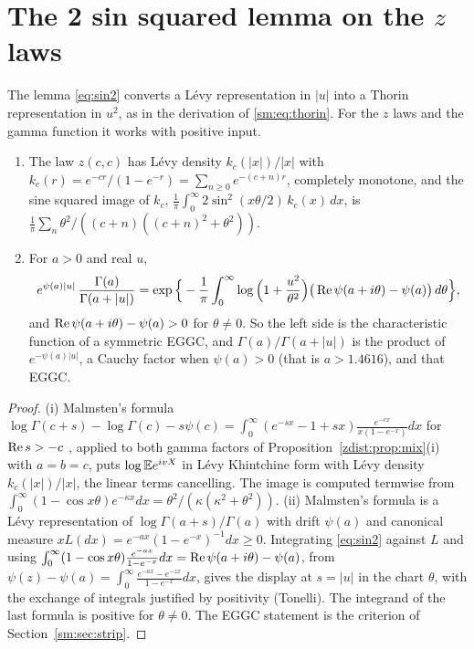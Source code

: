 \section{The 2 sin squared lemma on the \texorpdfstring{$z$}{z} laws}\label{zdist:sec:sin2}

The lemma \eqref{eq:sin2} converts a L\'evy representation in $|u|$ into a Thorin representation in $u^2$, as in the derivation of \eqref{sm:eq:thorin}. For the $z$ laws and the gamma function it works with positive input.

\begin{proposition}\label{zdist:prop:sin2}
\begin{enumerate}
\item[(i)] The law $z(c,c)$ has L\'evy density $k_c(|x|)/|x|$ with $k_c(r)=e^{-cr}/(1-e^{-r})=\sum_{n\ge0}e^{-(c+n)r}$, completely monotone, and the sine squared image of $k_c$, $\frac1\pi\int_0^\infty2\sin^2(x\theta/2)\,k_c(x)\,dx$, is $\frac1\pi\sum_n\theta^2/((c+n)((c+n)^2+\theta^2))$.
\item[(ii)] For $a>0$ and real $u$,
\[
e^{\psi(a)|u|}\,\frac{\Gamma(a)}{\Gamma(a+|u|)}=\exp\Big\{-\frac1\pi\int_0^\infty\log\Big(1+\frac{u^2}{\theta^2}\Big)\big(\operatorname{Re}\psi(a+i\theta)-\psi(a)\big)\,d\theta\Big\},
\]
and $\operatorname{Re}\psi(a+i\theta)-\psi(a)>0$ for $\theta\ne0$. So the left side is the characteristic function of a symmetric EGGC, and $\Gamma(a)/\Gamma(a+|u|)$ is the product of $e^{-\psi(a)|u|}$, a Cauchy factor when $\psi(a)>0$ (that is $a>1.4616$), and that EGGC.
\end{enumerate}
\end{proposition}

\begin{proof}
(i) Malmsten's formula $\log\Gamma(c+s)-\log\Gamma(c)-s\psi(c)=\int_0^\infty(e^{-sx}-1+sx)\frac{e^{-cx}}{x(1-e^{-x})}dx$ for $\operatorname{Re} s>-c$ \cite[Section 5.9]{DLMF}, applied to both gamma factors of Proposition~\ref{zdist:prop:mix}(i) with $a=b=c$, puts $\log\mathbb{E} e^{ivX}$ in L\'evy Khintchine form with L\'evy density $k_c(|x|)/|x|$, the linear terms cancelling. The image is computed termwise from $\int_0^\infty(1-\cos x\theta)e^{-\kappa x}dx=\theta^2/(\kappa(\kappa^2+\theta^2))$. (ii) Malmsten's formula is a L\'evy representation of $\log\Gamma(a+s)/\Gamma(a)$ with drift $\psi(a)$ and canonical measure $xL(dx)=e^{-ax}(1-e^{-x})^{-1}dx\ge0$. Integrating \eqref{eq:sin2} against $L$ and using $\int_0^\infty(1-\cos x\theta)\frac{e^{-ax}}{1-e^{-x}}dx=\operatorname{Re}\psi(a+i\theta)-\psi(a)$, from $\psi(z)-\psi(a)=\int_0^\infty\frac{e^{-ax}-e^{-zx}}{1-e^{-x}}dx$, gives the display at $s=|u|$ in the chart $\theta$, with the exchange of integrals justified by positivity (Tonelli). The integrand of the last formula is positive for $\theta\ne0$. The EGGC statement is the criterion of Section~\ref{sm:sec:strip}.
\end{proof}

